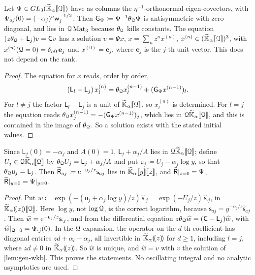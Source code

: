 \begin{lem}
\label{lem:gen-wkb}
Let $\Psi\in GL_3(\widetilde{\mathbb{K}}_{\alpha}[\![ \mathcal{Q} ]\!])$ have as columns the $\eta^{-1}$-orthonormal eigen-covectors, with $\Psi_{aj}(0)=(-\alpha_j)^a\mathsf{w}_j^{-1/2}$. Then $\mathsf{G}_{\Psi}\coloneqq\Psi^{-1}\theta_{\mathcal{Q}}\Psi$ is antisymmetric with zero diagonal, and lies in $\mathcal{Q}\,\mathrm{Mat}_3$ because $\theta_{\mathcal{Q}}$ kills constants. The equation $(z\theta_{\mathcal{Q}}+\mathsf{L}_j)v=\mathsf{C} v$ has a solution $v=\Psi x$, $x=\sum_nz^nx^{(n)}$, $x^{(n)}\in(\widetilde{\mathbb{K}}_{\alpha}[\![ \mathcal{Q} ]\!])^3$, with $x^{(n)}(\mathcal{Q}=0)=\delta_{n0}\,\mathbf{e}_j$ and $x^{(0)}=\mathbf{e}_j$, where $\mathbf{e}_j$ is the $j$-th unit vector. This does not depend on the rank.
\end{lem}
\begin{proof}
The equation for $x$ reads, order by order,
\[
(\mathsf{L}_l-\mathsf{L}_j)\,x_l^{(n)}=\theta_{\mathcal{Q}} x_l^{(n-1)}+(\mathsf{G}_{\Psi} x^{(n-1)})_l.
\]
For $l\neq j$ the factor $\mathsf{L}_l-\mathsf{L}_j$ is a unit of $\widetilde{\mathbb{K}}_{\alpha}[\![ \mathcal{Q} ]\!]$, so $x_l^{(n)}$ is determined. For $l=j$ the equation reads $\theta_{\mathcal{Q}} x_j^{(n-1)}=-(\mathsf{G}_{\Psi} x^{(n-1)})_j$, which lies in $\mathcal{Q}\widetilde{\mathbb{K}}_{\alpha}[\![ \mathcal{Q} ]\!]$, and this is contained in the image of $\theta_{\mathcal{Q}}$. So a solution exists with the stated initial values.
\end{proof}

\begin{lem}
\label{lem:gen-compare}
Since $\mathsf{L}_j(0)=-\alpha_j$ and $A(0)=1$, $\mathsf{L}_j+\alpha_j/A$ lies in $\mathcal{Q}\widetilde{\mathbb{K}}_{\alpha}[\![ \mathcal{Q} ]\!]$; define $U_j\in\mathcal{Q}\widetilde{\mathbb{K}}_{\alpha}[\![ \mathcal{Q} ]\!]$ by $\theta_{\mathcal{Q}} U_j=\mathsf{L}_j+\alpha_j/A$ and put $\mathsf{u}_j\coloneqq U_j-\alpha_j\log y$, so that $\theta_{\mathcal{Q}}\mathsf{u}_j=\mathsf{L}_j$. Then $\widetilde{\mathsf{R}}_{aj}\coloneqq\mathrm{e}^{-\mathsf{u}_j/z}\mathsf{s}_{aj}$ lies in $\widetilde{\mathbb{K}}_{\alpha}[\![ y ]\!][\![ z ]\!]$, and $\widetilde{\mathsf{R}}|_{z=0}=\Psi$, $\widetilde{\mathsf{R}}|_{y=0}=\Psi|_{y=0}$.
\end{lem}
\begin{proof}
Put $\widehat{w}\coloneqq\exp(-(\mathsf{u}_j+\alpha_j\log y)/z)\,\widehat{\mathsf{s}}_{\cdot j}=\exp(-U_j/z)\,\widehat{\mathsf{s}}_{\cdot j}$, in $\widetilde{\mathbb{K}}_{\alpha}(\!(z)\!)[\![ \mathcal{Q} ]\!]$. Here $\log y$, not $\log\mathcal{Q}$, is the correct logarithm, because $\mathsf{s}_{aj}=y^{-\alpha_j/z}\widehat{\mathsf{s}}_{aj}$. Then $\widehat{w}=\mathrm{e}^{-\mathsf{u}_j/z}\mathsf{s}_{\cdot j}$, and from the differential equation $z\theta_{\mathcal{Q}}\widehat{w}=(\mathsf{C}-\mathsf{L}_j)\widehat{w}$, with $\widehat{w}|_{\mathcal{Q}=0}=\Psi_{\cdot j}(0)$. In the $\mathcal{Q}$-expansion, the operator on the $d$-th coefficient has diagonal entries $zd+\alpha_l-\alpha_j$, all invertible in $\widetilde{\mathbb{K}}_{\alpha}(\!(z)\!)$ for $d\geq1$, including $l=j$, where $zd\neq0$ in $\widetilde{\mathbb{K}}_{\alpha}(\!(z)\!)$. So $\widehat{w}$ is unique, and $\widehat{w}=v$ with $v$ the solution of \cref{lem:gen-wkb}. This proves the statements. No oscillating integral and no analytic asymptotics are used.
\end{proof}

